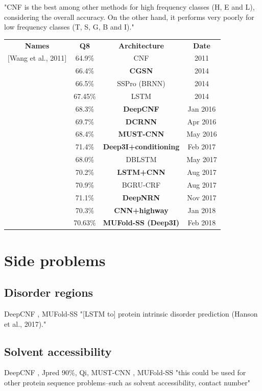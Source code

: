 \documentclass[]{scrartcl}
\begin{document}
"CNF is the best among other methods for high frequency classes (H, E and L), considering the overall accuracy. On the other hand, it performs very poorly for low frequency classes (T, S, G, B and I)." \cite{Hattori2017}
\begin{table}[h]
	\begin{tabular}{cccc}
		\textbf{Names} & \textbf{Q8} & \textbf{Architecture} & \textbf{Date} \\
		$[$Wang et al., 2011$]$	& 64.9\% 	& CNF 			& 2011 \\ 
		\cite{Zhou2014}	& 66.4\% 	& \textbf{CGSN} 			& 2014 \\ 
		\cite{Magnan2014} & 66.5\% & SSPro (BRNN) & 2014 \\
		\cite{Sønderby2014}	& 67.45\% 	& LSTM 			& 2014 	\\ 
		\cite{Wang2016} & 68.3\% & \textbf{DeepCNF} 	& Jan 2016 \\ 
		\cite{Li2016}	& 69.7\% 	& \textbf{DCRNN} 		& Apr 2016 \\
		\cite{Lin2016} 	& 68.4\% 	& \textbf{MUST-CNN} 		& May 2016 \\
		\cite{Busia2017}& 71.4\%& \textbf{Deep3I+conditioning}& Feb 2017 \\
		\cite{Hattori2017} & 68.0\%	& DBLSTM		& May 2017 \\
		\cite{Jurtz2017} & 70.2\%	& \textbf{LSTM+CNN} 		& Aug 2017 \\
		\cite{Johansen2017} & 70.9\% & BGRU-CRF & Aug 2017 \\
		\cite{8371925} & 71.1\% & \textbf{DeepNRN} & Nov 2017 \\
		\cite{Zhou2018} & 70.3\% & \textbf{CNN+highway} & Jan 2018 \\
		\cite{Fang2017}& 70.63\% & \textbf{MUFold-SS (Deep3I)}&Feb 2018\\
	\end{tabular}
\end{table}

\section{Side problems}
\subsection{Disorder regions}
DeepCNF \cite{Wang2016},
MUFold-SS \cite{Fang2017}
"[LSTM to] protein intrinsic disorder prediction (Hanson et al., 2017)." \cite{Heffernan2017}

\subsection{Solvent accessibility}
DeepCNF \cite{Wang2016},
Jpred 90\%,
Qi,
MUST-CNN \cite{Lin2016},
MUFold-SS \cite{Fang2017}
"this could be used for other protein sequence problems–such as solvent accessibility, contact number" \cite{Busia2017}
\end{document}
